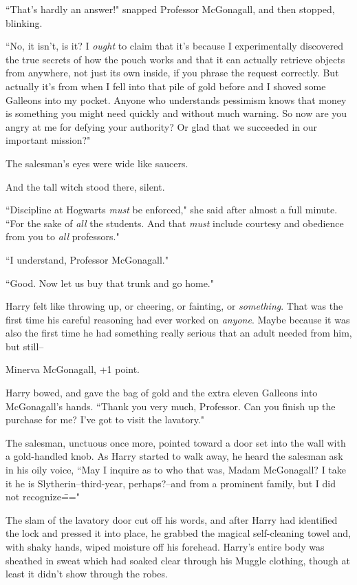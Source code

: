 ``That's hardly an answer!" snapped Professor McGonagall, and then stopped, blinking.

``No, it isn't, is it? I \emph{ought} to claim that it's because I experimentally discovered the true secrets of how the pouch works and that it can actually retrieve objects from anywhere, not just its own inside, if you phrase the request correctly. But actually it's from when I fell into that pile of gold before and I shoved some Galleons into my pocket. Anyone who understands pessimism knows that money is something you might need quickly and without much warning. So now are you angry at me for defying your authority? Or glad that we succeeded in our important mission?"

The salesman's eyes were wide like saucers.

And the tall witch stood there, silent.

``Discipline at Hogwarts \emph{must} be enforced," she said after almost a full minute. ``For the sake of \emph{all} the students. And that \emph{must} include courtesy and obedience from you to \emph{all} professors."

``I understand, Professor McGonagall."

``Good. Now let us buy that trunk and go home."

Harry felt like throwing up, or cheering, or fainting, or \emph{something}. That was the first time his careful reasoning had ever worked on \emph{anyone}. Maybe because it was also the first time he had something really serious that an adult needed from him, but still\---

Minerva McGonagall, +1 point.

Harry bowed, and gave the bag of gold and the extra eleven Galleons into McGonagall's hands. ``Thank you very much, Professor. Can you finish up the purchase for me? I've got to visit the lavatory."

The salesman, unctuous once more, pointed toward a door set into the wall with a gold-handled knob. As Harry started to walk away, he heard the salesman ask in his oily voice, ``May I inquire as to who that was, Madam McGonagall? I take it he is Slytherin\---third-year, perhaps?\---and from a prominent family, but I did not recognize\==="

The slam of the lavatory door cut off his words, and after Harry had identified the lock and pressed it into place, he grabbed the magical self-cleaning towel and, with shaky hands, wiped moisture off his forehead. Harry's entire body was sheathed in sweat which had soaked clear through his Muggle clothing, though at least it didn't show through the robes.

